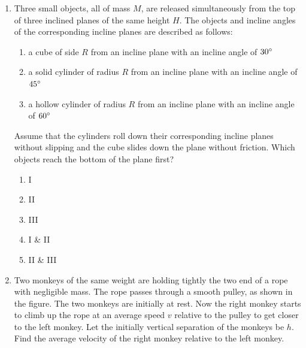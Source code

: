 \documentclass[12pt,letterpaper]{article}
\begin{document}
\begin{enumerate}[resume]

\item
Three small objects, all of mass $M$, are released simultaneously from the top of three inclined planes of the same height $H$. The objects and incline angles of the corresponding incline planes are described as follows:
\begin{enumerate}[label=\Roman*.]
\item a cube of side $R$ from an incline plane with an incline angle of $30\degree$
\item a solid cylinder of radius $R$ from an incline plane with an incline angle of $45\degree$
\item a hollow cylinder of radius $R$ from an incline plane with an incline angle of $60\degree$
\end{enumerate}
Assume that the cylinders roll down their corresponding incline planes without slipping and the cube slides down the plane without friction. Which objects reach the bottom of the plane first?
\begin{enumerate}
\item I
\item II
\item III
\item I \& II
\item II \& III
\end{enumerate}

\vfill
\newpage

\item
Two monkeys of the same weight are holding tightly the two end of a rope with negligible mass. The rope passes through a smooth pulley, as shown in the figure. The two monkeys are initially at rest. Now the right monkey starts to climb up the rope at an average speed $v$ relative to the pulley to get closer to the left monkey. Let the initially vertical separation of the monkeys be $h$. Find the average velocity of the right monkey relative to the left monkey.


\end{enumerate}
\end{document}
